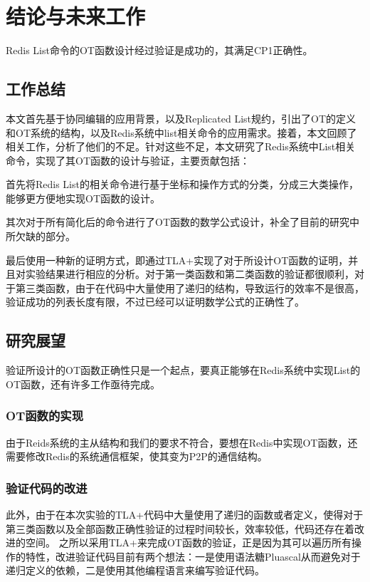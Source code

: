\chapter{结论与未来工作}
\par Redis List命令的OT函数设计经过验证是成功的，其满足CP1正确性。
\section{工作总结}
\par 本文首先基于协同编辑的应用背景，以及Replicated List规约，引出了OT的定义和OT系统的结构，以及Redis系统中list相关命令的应用需求。接着，本文回顾了相关工作，分析了他们的不足。针对这些不足，本文研究了Redis系统中List相关命令，实现了其OT函数的设计与验证，主要贡献包括：
\par 首先将Redis List的相关命令进行基于坐标和操作方式的分类，分成三大类操作，能够更方便地实现OT函数的设计。
\par 其次对于所有简化后的命令进行了OT函数的数学公式设计，补全了目前的研究中所欠缺的部分。
\par 最后使用一种新的证明方式，即通过TLA+实现了对于所设计OT函数的证明，并且对实验结果进行相应的分析。对于第一类函数和第二类函数的验证都很顺利，对于第三类函数，由于在代码中大量使用了递归的结构，导致运行的效率不是很高，验证成功的列表长度有限，不过已经可以证明数学公式的正确性了。
\section{研究展望}
验证所设计的OT函数正确性只是一个起点，要真正能够在Redis系统中实现List的OT函数，还有许多工作亟待完成。
\subsection{OT函数的实现}
由于Reids系统的主从结构和我们的要求不符合，要想在Redis中实现OT函数，还需要修改Redis的系统通信框架，使其变为P2P的通信结构。
\subsection{验证代码的改进}
此外，由于在本次实验的TLA+代码中大量使用了递归的函数或者定义，使得对于第三类函数以及全部函数正确性验证的过程时间较长，效率较低，代码还存在着改进的空间。
之所以采用TLA+来完成OT函数的验证，正是因为其可以遍历所有操作的特性，改进验证代码目前有两个想法：一是使用语法糖Pluascal从而避免对于递归定义的依赖，二是使用其他编程语言来编写验证代码。